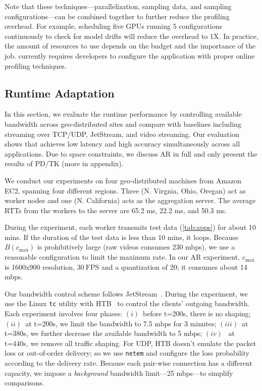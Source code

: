 Note that these techniques---parallelization, sampling data, and sampling
configurations---can be combined together to further reduce the profiling
overhead. For example, scheduling five GPUs running 5 configurations
continuously to check for model drifts will reduce the overhead to 1X\@. In
practice, the amount of resources to use depends on the budget and the
importance of the job. \sysname{} currently requires developers to configure the
application with proper online profiling techniques.


\subsection{Runtime Adaptation}
\label{sec:runtime-adaptation}

In this section, we evaluate the runtime performance by controlling available
bandwidth across geo-distributed sites and compare \sysname{} with baselines
including streaming over TCP/UDP, JetStream, and video streaming. Our evaluation
shows that \sysname{} achieves low latency and high accuracy simultaneously
across all applications. Due to space constraints, we discuss AR in full and
only present the results of PD/TK (more in appendix).

 We conduct our experiments on four geo-distributed
machines from Amazon EC2, spanning four different regions. Three (N. Virgnia,
Ohio, Oregan) act as worker nodes and one (N. California) acts as the
aggregation server. The average RTTs from the workers to the server are 65.2 ms,
22.2 ms, and 50.3 ms.

During the experiment, each worker transmits test data (\autoref{tab:apps}) for
about 10 mins. If the duration of the test data is less than 10 mins, it
loops. Because $B(c_{\max})$ is prohibitively large (raw videos consumes 230
mbps), we use a reasonable configuration to limit the maximum rate. In our AR
experiment, $c_{\max}$ is 1600x900 resolution, \(30~\text{FPS}\) and a
quantization of 20; it consumes about 14 mbps.

Our bandwidth control scheme follows
JetStream~\cite{rabkin2014aggregation}. During the experiment, we use the Linux
\texttt{tc} utility with HTB~\cite{htb, lartc} to control the clients' outgoing
bandwidth. Each experiment involves four phases: $(i)$~before t=200s, there is
no shaping; $(ii)$~at t=200s, we limit the bandwidth to 7.5 mbps for 3 minutes;
$(iii)$~at t=380s, we further decrease the available bandwidth to 5 mbps;
$(iv)$~ at t=440s, we remove all traffic shaping. For UDP, HTB doesn't emulate
the packet loss or out-of-order delivery; so we use \texttt{netem} and configure
the loss probability according to the delivery rate. Because each pair-wise
connection has a different capacity, we impose a \textit{background} bandwidth
limit---25 mbps---to simplify comparisons.

